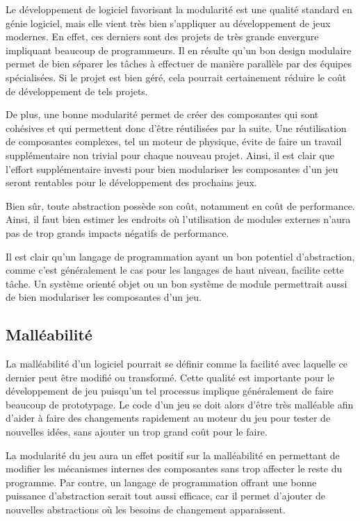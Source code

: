 \documentclass[12pt,twoside,letterpaper,francais]{book}
\begin{document}
Le développement de logiciel favorisant la modularité est une qualité
standard en génie logiciel, mais elle vient très bien s'appliquer au
développement de jeux modernes. En effet, ces derniers sont des
projets de très grande envergure impliquant beaucoup de
programmeurs. Il en résulte qu'un bon design modulaire permet de bien
séparer les tâches à effectuer de manière parallèle par des équipes
spécialisées. Si le projet est bien géré, cela pourrait certainement
réduire le coût de développement de tels projets.

De plus, une bonne modularité permet de créer des composantes qui sont
cohésives et qui permettent donc d'être réutilisées par la suite. Une
réutilisation de composantes complexes, tel un moteur de physique,
évite de faire un travail supplémentaire non trivial pour chaque
nouveau projet. Ainsi, il est clair que l'effort supplémentaire
investi pour bien modulariser les composantes d'un jeu seront
rentables pour le développement des prochains jeux.

Bien sûr, toute abstraction possède son coût, notamment en coût de
performance. Ainsi, il faut bien estimer les endroits où l'utilisation
de modules externes n'aura pas de trop grands impacts négatifs de
performance.

Il est clair qu'un langage de programmation ayant un bon potentiel
d'abstraction, comme c'est généralement le cas pour les langages de
haut niveau, facilite cette tâche. Un système orienté objet ou un bon
système de module permettrait aussi de bien modulariser les
composantes d'un jeu.

\FloatBarrier
\subsection{Malléabilité}
La malléabilité d'un logiciel pourrait se définir comme la facilité
avec laquelle ce dernier peut être modifié ou transformé. Cette
qualité est importante pour le développement de jeu puisqu'un tel
processus implique généralement de faire beaucoup de prototypage. Le
code d'un jeu se doit alors d'être très malléable afin d'aider à faire
des changements rapidement au moteur du jeu pour tester de nouvelles
idées, sans ajouter un trop grand coût pour le faire.

La modularité du jeu aura un effet positif sur la malléabilité en
permettant de modifier les mécanismes internes des composantes sans
trop affecter le reste du programme. Par contre, un langage de
programmation offrant une bonne puissance d'abstraction serait tout
aussi efficace, car il permet d'ajouter de nouvelles abstractions où
les besoins de changement apparaissent.
\end{document}
